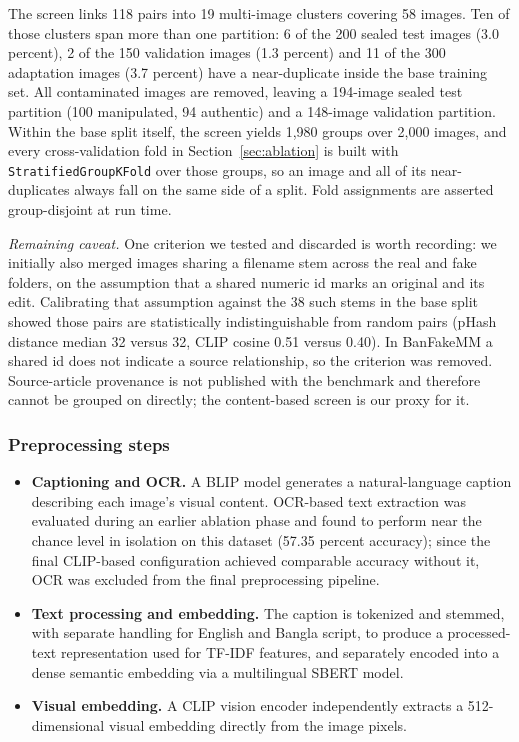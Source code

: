 \documentclass[conference,a4paper]{IEEEtran}
\begin{document}
The screen links 118 pairs into 19 multi-image clusters covering 58 images.
Ten of those clusters span more than one partition: 6 of the 200 sealed test
images (3.0 percent), 2 of the 150 validation images (1.3 percent) and 11 of
the 300 adaptation images (3.7 percent) have a near-duplicate inside the base
training set. All contaminated images are removed, leaving a 194-image sealed
test partition (100 manipulated, 94 authentic) and a 148-image validation
partition. Within the base split itself, the screen yields 1{,}980 groups over
2{,}000 images, and every cross-validation fold in Section~\ref{sec:ablation}
is built with \texttt{StratifiedGroupKFold} over those groups, so an image and
all of its near-duplicates always fall on the same side of a split. Fold
assignments are asserted group-disjoint at run time.

\emph{Remaining caveat.} One criterion we tested and discarded is worth
recording: we initially also merged images sharing a filename stem across the
real and fake folders, on the assumption that a shared numeric id marks an
original and its edit. Calibrating that assumption against the 38 such stems
in the base split showed those pairs are statistically indistinguishable from
random pairs (pHash distance median 32 versus 32, CLIP cosine 0.51 versus
0.40). In BanFakeMM a shared id does not indicate a source relationship, so
the criterion was removed. Source-article provenance is not published with the
benchmark and therefore cannot be grouped on directly; the content-based
screen is our proxy for it.

\subsubsection{Preprocessing steps}

\begin{itemize}
\item \textbf{Captioning and OCR.} A BLIP model generates a natural-language
caption describing each image's visual content. OCR-based text extraction was
evaluated during an earlier ablation phase and found to perform near the
chance level in isolation on this dataset (57.35 percent accuracy); since the
final CLIP-based configuration achieved comparable accuracy without it, OCR
was excluded from the final preprocessing pipeline.

\item \textbf{Text processing and embedding.} The caption is tokenized and
stemmed, with separate handling for English and Bangla script, to produce a
processed-text representation used for TF-IDF features, and separately encoded
into a dense semantic embedding via a multilingual SBERT model.

\item \textbf{Visual embedding.} A CLIP vision encoder independently extracts
a 512-dimensional visual embedding directly from the image pixels.
\end{itemize}
\end{document}
